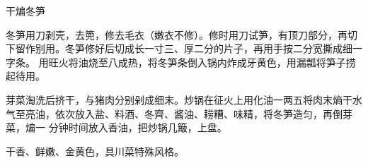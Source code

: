 \begin{recipe}{干煸冬笋}

\ingredients


\preparation

\step 冬笋用刀剥壳，去篼，修去毛衣（嫩衣不修）。修时用刀试笋，有顶刀部分，再切
下留作别用。冬笋修好后切成长一寸三、厚二分的片子，再用手按二分宽撕成细一字条。
用旺火将油烧至八成热，将冬笋条倒入锅内炸成牙黄色，用漏瓢将笋子捞起待用。

\step 芽菜淘洗后挤干，与猪肉分别剁成细末。炒锅在征火上用化油一两五将肉末熵干水
气至亮油，依次放入盐、料酒、冬齊、酱油、耢糟、味精，将冬笋造匀，再倒芽菜，煸一
分钟时间放入香油，把炒锅几簸，上盘。

\features

干香、鲜嫩、金黄色，具川菜特殊风格。

\end{recipe}

